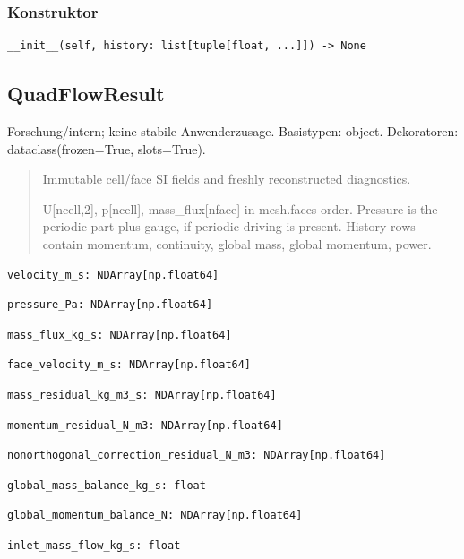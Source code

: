 \subsubsection*{Konstruktor}
\begin{lstlisting}
__init__(self, history: list[tuple[float, ...]]) -> None
\end{lstlisting}
\subsection{QuadFlowResult}
Forschung/intern; keine stabile Anwenderzusage.
Basistypen: object. Dekoratoren: dataclass(frozen=True, slots=True).
\begin{quote}
Immutable cell/face SI fields and freshly reconstructed diagnostics.\par U[ncell,2], p[ncell], mass\_flux[nface] in mesh.faces order. Pressure is the periodic part plus gauge, if periodic driving is present. History rows contain momentum, continuity, global mass, global momentum, power.
\end{quote}
\begin{lstlisting}
velocity_m_s: NDArray[np.float64]
\end{lstlisting}
\begin{lstlisting}
pressure_Pa: NDArray[np.float64]
\end{lstlisting}
\begin{lstlisting}
mass_flux_kg_s: NDArray[np.float64]
\end{lstlisting}
\begin{lstlisting}
face_velocity_m_s: NDArray[np.float64]
\end{lstlisting}
\begin{lstlisting}
mass_residual_kg_m3_s: NDArray[np.float64]
\end{lstlisting}
\begin{lstlisting}
momentum_residual_N_m3: NDArray[np.float64]
\end{lstlisting}
\begin{lstlisting}
nonorthogonal_correction_residual_N_m3: NDArray[np.float64]
\end{lstlisting}
\begin{lstlisting}
global_mass_balance_kg_s: float
\end{lstlisting}
\begin{lstlisting}
global_momentum_balance_N: NDArray[np.float64]
\end{lstlisting}
\begin{lstlisting}
inlet_mass_flow_kg_s: float
\end{lstlisting}
